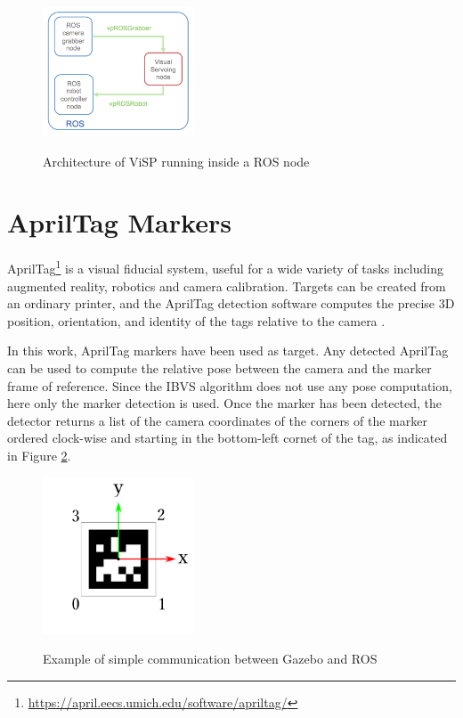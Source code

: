 \begin{figure}[!htb]
	\caption[Architecture of ViSP running inside a ROS node]{Architecture of ViSP running inside a ROS node~\protect\cite{visp_ros}}
	\centering
	\includegraphics[width=0.4\textwidth]{content/chapter_05/images/visual-servo-ros-node.png}
	\label{fig:visual-servo-ros-node}
\end{figure}

\section{AprilTag Markers}
\label{sec:apriltag_markers}

AprilTag\footnote{\url{https://april.eecs.umich.edu/software/apriltag/}} is a visual fiducial system, useful for a wide variety of tasks including augmented reality, robotics and camera calibration. Targets can be created from an ordinary printer, and the AprilTag detection software computes the precise 3D position, orientation, and identity of the tags relative to the camera \cite{apriltag_hp}. 

In this work, AprilTag markers have been used as target. Any detected AprilTag can be used to compute the relative pose between the camera and the marker frame of reference. Since the IBVS algorithm does not use any pose computation, here only the marker detection is used. Once the marker has been detected, the detector returns a list of the camera coordinates of the corners of the marker ordered clock-wise and starting in the bottom-left cornet of the tag, as indicated in Figure \ref{fig:april-frames}.

\begin{figure}[!htb]
	\caption{Example of simple communication between Gazebo and ROS}
	\centering
	\includegraphics[width=0.4\textwidth]{content/chapter_05/images/april-frames}
	\label{fig:april-frames}
\end{figure}


